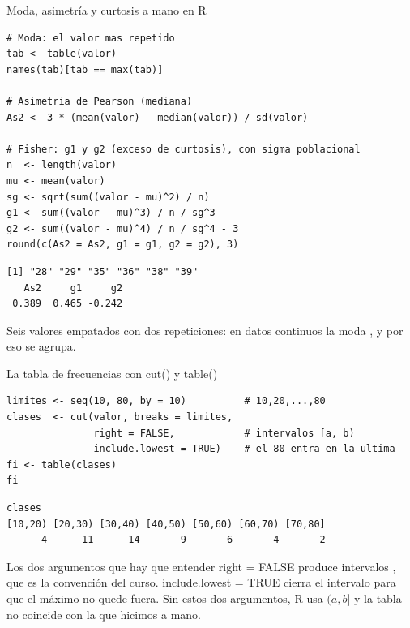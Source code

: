 \documentclass[aspectratio=169,10pt]{beamer}
\newcommand{\fx}[1]{{\ttfamily\color{uniAzul}#1}}
\begin{document}
\begin{frame}[fragile]{Moda, asimetría y curtosis a mano en R}
  \footnotesize
\begin{lstlisting}[style=Rcode]
# Moda: el valor mas repetido
tab <- table(valor)
names(tab)[tab == max(tab)]

# Asimetria de Pearson (mediana)
As2 <- 3 * (mean(valor) - median(valor)) / sd(valor)

# Fisher: g1 y g2 (exceso de curtosis), con sigma poblacional
n  <- length(valor)
mu <- mean(valor)
sg <- sqrt(sum((valor - mu)^2) / n)
g1 <- sum((valor - mu)^3) / n / sg^3
g2 <- sum((valor - mu)^4) / n / sg^4 - 3
round(c(As2 = As2, g1 = g1, g2 = g2), 3)
\end{lstlisting}
\begin{lstlisting}[style=Rout]
[1] "28" "29" "35" "36" "38" "39"
   As2     g1     g2
 0.389  0.465 -0.242
\end{lstlisting}

  \vspace{-0.1cm}
  {\tiny\color{uniGris} Seis valores empatados con dos repeticiones: en datos
  continuos la moda , y por eso se agrupa.}
\end{frame}

\begin{frame}[fragile]{La tabla de frecuencias con \fx{cut()} y \fx{table()}}
  \footnotesize
\begin{lstlisting}[style=Rcode]
limites <- seq(10, 80, by = 10)          # 10,20,...,80
clases  <- cut(valor, breaks = limites,
               right = FALSE,            # intervalos [a, b)
               include.lowest = TRUE)    # el 80 entra en la ultima
fi <- table(clases)
fi
\end{lstlisting}
\begin{lstlisting}[style=Rout]
clases
[10,20) [20,30) [30,40) [40,50) [50,60) [60,70) [70,80]
      4      11      14       9       6       4       2
\end{lstlisting}

  \vspace{0.05cm}
  \begin{alertblock}{Los dos argumentos que hay que entender}
    \tiny
    \fx{right = FALSE} produce intervalos , que es la convención del curso. \quad
    \fx{include.lowest = TRUE} cierra el  intervalo para que
    el máximo no quede fuera. Sin estos dos argumentos, R usa $(a, b]$ y la
    tabla no coincide con la que hicimos a mano.
  \end{alertblock}
\end{frame}
\end{document}
